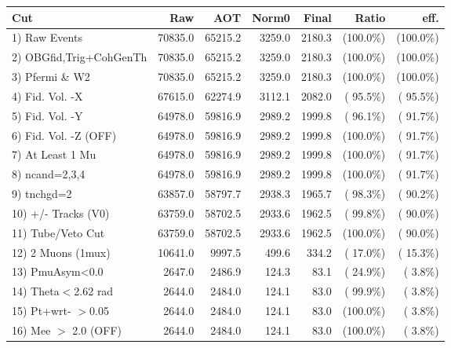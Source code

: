  \begin{table}[h!]\centering
 \begin{tabular}{||l||r|r|r|r|r|r||}
 \hline
 \hline
 Cut & Raw & AOT & Norm0 & Final & Ratio & eff.       \\
 \hline
  1) Raw Events           &      70835.0 &      65215.2 &       3259.0 &       2180.3 & (100.0\%) & (100.0\%) \\
  2) OBGfid,Trig+CohGenTh &      70835.0 &      65215.2 &       3259.0 &       2180.3 & (100.0\%) & (100.0\%) \\
  3) Pfermi \& W2         &      70835.0 &      65215.2 &       3259.0 &       2180.3 & (100.0\%) & (100.0\%) \\
  4) Fid. Vol. -X         &      67615.0 &      62274.9 &       3112.1 &       2082.0 & ( 95.5\%) & ( 95.5\%) \\
  5) Fid. Vol. -Y         &      64978.0 &      59816.9 &       2989.2 &       1999.8 & ( 96.1\%) & ( 91.7\%) \\
  6) Fid. Vol. -Z (OFF)   &      64978.0 &      59816.9 &       2989.2 &       1999.8 & (100.0\%) & ( 91.7\%) \\
  7) At Least 1 Mu        &      64978.0 &      59816.9 &       2989.2 &       1999.8 & (100.0\%) & ( 91.7\%) \\
  8) ncand=2,3,4          &      64978.0 &      59816.9 &       2989.2 &       1999.8 & (100.0\%) & ( 91.7\%) \\
  9) tnchgd=2             &      63857.0 &      58797.7 &       2938.3 &       1965.7 & ( 98.3\%) & ( 90.2\%) \\
 10) +/- Tracks (V0)      &      63759.0 &      58702.5 &       2933.6 &       1962.5 & ( 99.8\%) & ( 90.0\%) \\
 11) Tube/Veto Cut        &      63759.0 &      58702.5 &       2933.6 &       1962.5 & (100.0\%) & ( 90.0\%) \\
 12) 2 Muons (1mux)       &      10641.0 &       9997.5 &        499.6 &        334.2 & ( 17.0\%) & ( 15.3\%) \\
 13) PmuAsym<0.0          &       2647.0 &       2486.9 &        124.3 &         83.1 & ( 24.9\%) & (  3.8\%) \\
 14) Theta$<$2.62 rad     &       2644.0 &       2484.0 &        124.1 &         83.0 & ( 99.9\%) & (  3.8\%) \\
 15) Pt+wrt- $>$0.05      &       2644.0 &       2484.0 &        124.1 &         83.0 & (100.0\%) & (  3.8\%) \\
 16) Mee $>$ 2.0  (OFF)   &       2644.0 &       2484.0 &        124.1 &         83.0 & (100.0\%) & (  3.8\%) \\

\end{tabular}
\end{table}
